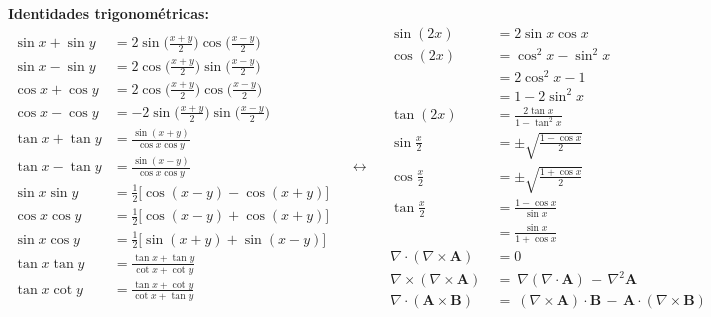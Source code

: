 \documentclass{article}
\begin{document}
\textbf{Identidades trigonométricas:}
\begin{equation*}
\begin{split}
  \sin x + \sin y &= 2 \sin \Big( \frac{x + y}{2} \Big) \cos \Big( \frac{x - y}{2} \Big)\\
  \sin x - \sin y &= 2 \cos \Big( \frac{x + y}{2} \Big) \sin \Big( \frac{x - y}{2} \Big)\\
  \cos x + \cos y &= 2 \cos \Big( \frac{x + y}{2} \Big) \cos \Big( \frac{x - y}{2} \Big)\\
  \cos x - \cos y &= -2 \sin \Big( \frac{x + y}{2} \Big) \sin \Big( \frac{x - y}{2} \Big)\\
  \tan x + \tan y &= \frac{ \sin(x + y) }{ \cos x \cos y}\\
  \tan x - \tan y &= \frac{ \sin(x - y) }{ \cos x \cos y}\\
    \sin x \sin y &= \frac{1}{2}\big[\cos(x - y) - \cos(x + y)\big]\\
  \cos x \cos y &= \frac{1}{2}\big[\cos(x - y) + \cos(x + y)\big]\\
  \sin x \cos y &= \frac{1}{2}\big[\sin(x + y) + \sin(x - y)\big]\\
  \tan x \tan y &= \frac{ \tan x + \tan y }{ \cot x + \cot y }\\
  \tan x \cot y &= \frac{ \tan x + \cot y }{ \cot x + \tan y }
\end{split}
\quad\leftrightarrow\quad
\begin{split}
  \sin(2x)  &= 2 \sin x \cos x\\
  \cos(2x)  &= \cos^2 x - \sin^2 x\\
            &= 2 \cos^2 x - 1\\
            &= 1 - 2 \sin^2 x\\
  \tan(2x)  &= \frac{2 \tan x}{1 - \tan^2 x} \\
  \sin \frac{x}{2}  &= \pm \sqrt{ \frac{1 - \cos x }{2} }\\
  \cos \frac{x}{2}  &= \pm \sqrt{ \frac{1 + \cos x }{2} }\\
  \tan \frac{x}{2}  &= \frac{1 - \cos x }{\sin x}\\
                    &= \frac{ \sin x }{ 1 + \cos x }\\
  \nabla \cdot (\nabla \times \mathbf {A} ) &= 0 \\
  \displaystyle \nabla \times \left(\nabla \times \mathbf {A} \right)\ &=\ \nabla (\nabla {\cdot }\mathbf {A} )\,-\,\nabla ^{2\!}\mathbf {A} \\
  \nabla \cdot (\mathbf{A} \times \mathbf{B} ) \ &= \ (\nabla {\times }\mathbf{A} )\cdot \mathbf{B} \,-\,\mathbf{A} \cdot (\nabla {\times }\mathbf{B} )
\end{split}
\end{equation*}
\end{document}
